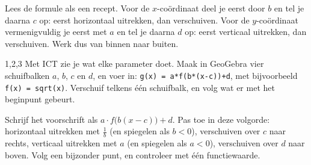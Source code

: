 Lees de formule als een recept. Voor de $x$-coördinaat deel je eerst door $b$ en tel je daarna $c$ op: eerst horizontaal uitrekken, dan verschuiven. Voor de $y$-coördinaat vermenigvuldig je eerst met $a$ en tel je daarna $d$ op: eerst verticaal uitrekken, dan verschuiven. Werk dus van binnen naar buiten.

\begin{alleenvoor}{1,2,3}
Met ICT zie je wat elke parameter doet. Maak in GeoGebra vier schuifbalken $a$, $b$, $c$ en $d$, en voer in: \texttt{g(x) = a*f(b*(x-c))+d}, met bijvoorbeeld \texttt{f(x) = sqrt(x)}. Verschuif telkens één schuifbalk, en volg wat er met het beginpunt gebeurt.

\end{alleenvoor}

\begin{werkwijze}
Schrijf het voorschrift als $a \cdot f\bigl(b(x - c)\bigr) + d$. Pas toe in deze volgorde: horizontaal uitrekken met $\frac1b$ (en spiegelen als $b < 0$), verschuiven over $c$ naar rechts, verticaal uitrekken met $a$ (en spiegelen als $a < 0$), verschuiven over $d$ naar boven. Volg een bijzonder punt, en controleer met één functiewaarde.
\end{werkwijze}

\begin{oefeningen}
\end{oefeningen}


